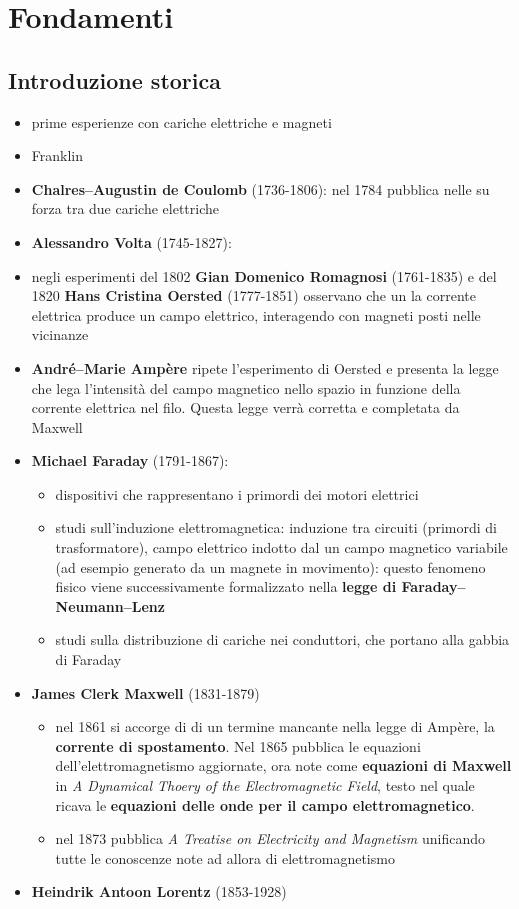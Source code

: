 

\chapter{Fondamenti}

\section{Introduzione storica}
\begin{itemize}
    \item prime esperienze con cariche elettriche e magneti
    \item Franklin
    \item \textbf{Chalres--Augustin de Coulomb} (1736-1806): nel 1784 pubblica nelle su forza tra due cariche elettriche
    \item \textbf{Alessandro Volta} (1745-1827):
    \item negli esperimenti del 1802 \textbf{Gian Domenico Romagnosi} (1761-1835) e del 1820 \textbf{Hans Cristina Oersted} (1777-1851) osservano che un la corrente elettrica produce un campo elettrico, interagendo con magneti posti nelle vicinanze
    \item \textbf{André--Marie Ampère} ripete l'esperimento di Oersted e presenta la legge che lega l'intensità del campo magnetico nello spazio in funzione della corrente elettrica nel filo. Questa legge verrà corretta e completata da Maxwell
    \item \textbf{Michael Faraday} (1791-1867):
        \begin{itemize}
           \item dispositivi che rappresentano i primordi dei motori elettrici
           \item studi sull'induzione elettromagnetica: induzione tra circuiti (primordi di trasformatore), campo elettrico indotto dal un campo magnetico variabile (ad esempio generato da un magnete in movimento): questo fenomeno fisico viene successivamente formalizzato nella \textbf{legge di Faraday--Neumann--Lenz}
            \item studi sulla distribuzione di cariche nei conduttori, che portano alla gabbia di Faraday
        \end{itemize}
    \item \textbf{James Clerk Maxwell} (1831-1879) 
    \begin{itemize}
        \item nel 1861 si accorge di di un termine mancante nella legge di Ampère, la \textbf{corrente di spostamento}. Nel 1865 pubblica le equazioni dell'elettromagnetismo aggiornate, ora note come \textbf{equazioni di Maxwell} in \textit{A Dynamical Thoery of the Electromagnetic Field}, testo nel quale ricava le \textbf{equazioni delle onde per il campo elettromagnetico}.
        \item nel 1873 pubblica \textit{A Treatise on Electricity and Magnetism} unificando tutte le conoscenze note ad allora di elettromagnetismo
    \end{itemize}
    \item \textbf{Heindrik Antoon Lorentz} (1853-1928)
\end{itemize}


